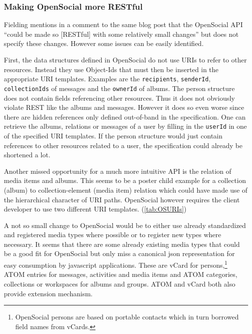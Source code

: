 \documentclass[11pt,a4paper,headsepline,twoside]{scrartcl}		%
\begin{document}
\subsubsection{Making OpenSocial more RESTful}
\label{sec:poss-impr}

Fielding mentions in a comment to the same blog post \cite{Fielding2008} that the
OpenSocial API ``could be made so [RESTful] with some relatively small changes''
but does not specify these changes. However some issues can be easily
identified.

First, the data structures defined in OpenSocial do not use URIs to refer to
other resources. Instead they use Object-Ids that must then be inserted in the
appropriate URI templates. Examples are the \texttt{recipients},
\texttt{senderId}, \texttt{collectionIds} of messages and the \texttt{ownerId}
of albums. The person structure does not contain fields referencing other
resources. Thus it does not obviously violate REST like the albums and
messages. However it does so even worse since there are hidden references only
defined out-of-band in the specification. One can retrieve the albums, relations
or messages of a user by filling in the \texttt{userId} in one of the specified
URI templates. If the person structure would just contain references to other
resources related to a user, the specification could already be shortened a lot.

Another missed opportunity for a much more intuitive API is the relation of
media items and albums. This seems to be a poster child example for a collection
(album) to collection-element (media item) relation which could have made use of
the hierarchical character of URI paths. OpenSocial however requires the client
developer to use two different URI templates. (\autoref{tab:OSURIs})

A not so small change to OpenSocial would be to either use already standardized
and registered media types where possible or to register new types where
necessary. It seems that there are some already existing media types that could
be a good fit for OpenSocial but only miss a canonical json representation for
easy consumption by javascript applications. These are vCard for
persons,\footnote{OpenSocial persons are based on portable contacts which in
  turn borrowed field names from vCards.} ATOM entries \cite{RFC4287} for
messages, activities and media items and ATOM categories, collections or
workspaces \cite{RFC5023} for albums and groups. ATOM and vCard both also provide
extension mechanism.
  
\end{document}

